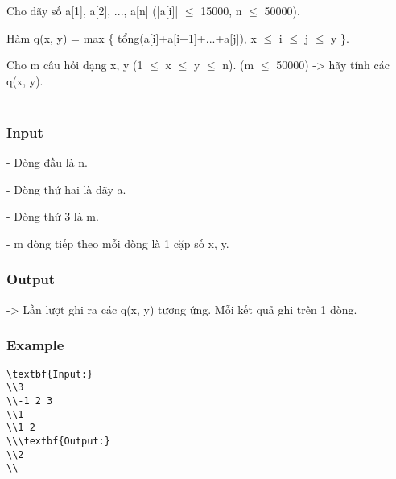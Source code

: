 



   Cho dãy số a[1], a[2], ..., a[n] (|a[i]|  $\le$  15000, n  $\le$  50000).  

   Hàm q(x, y) = max \{ tổng(a[i]+a[i+1]+...+a[j]), x  $\le$  i  $\le$  j  $\le$  y \}.  

   Cho m câu hỏi dạng x, y (1  $\le$  x  $\le$  y  $\le$  n). (m  $\le$  50000) -> hãy tính các q(x, y).   
\\
\\

\subsubsection{   Input  }

   - Dòng đầu là n.  

   - Dòng thứ hai là dãy a.  

   - Dòng thứ 3 là m.  

   - m dòng tiếp theo mỗi dòng là 1 cặp số x, y.  

\subsubsection{   Output  }

   -> Lần lượt ghi ra các q(x, y) tương ứng. Mỗi kết quả ghi trên 1 dòng.  

\subsubsection{   Example  }
\begin{verbatim}
\textbf{Input:}
\\3
\\-1 2 3
\\1
\\1 2
\\\textbf{Output:}
\\2
\\\end{verbatim}
